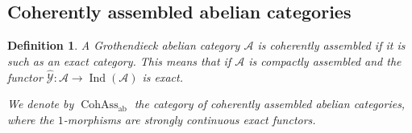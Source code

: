 \documentclass[11pt,leqno]{amsart}
\newtheorem{defi}[theo]{Definition}
\numberwithin{equation}{section}
\def\wt{\widetilde}
\newcommand{\indlim}[1][]{\mathop{\varinjlim}\limits_{#1}}
\newcommand{\xto}{\xrightarrow}
\newcommand{\Cone}{\operatorname{Cone}}
\newcommand{\Fiber}{\operatorname{Fiber}}
\newcommand{\cA}{{\mathcal A}}
\newcommand{\cC}{{\mathcal C}}
\newcommand{\cE}{{\mathcal E}}
\newcommand{\cY}{{\mathcal Y}}
\newcommand{\Cohass}{\operatorname{CohAss}}
\newcommand{\ab}{\operatorname{ab}}
\newcommand{\add}{\operatorname{add}}
\newcommand{\Ind}{\operatorname{Ind}}
\newcommand{\Stab}{\rm Stab}
\begin{document}
	


\subsection{Coherently assembled abelian categories}
\label{ssec:coh_ass_abelian_cats}

\begin{defi}\label{def:coh_ass_abelian_cats}
A Grothendieck abelian category $\cA$ is coherently assembled if it is such as an exact category. This means that if $\cA$ is compactly assembled and the functor $\hat{\cY}:\cA\to\Ind(\cA)$ is exact.

We denote by $\Cohass_{\ab}$ the category of coherently assembled abelian categories, where the $1$-morphisms are strongly continuous exact functors.
\end{defi}
\end{document}
